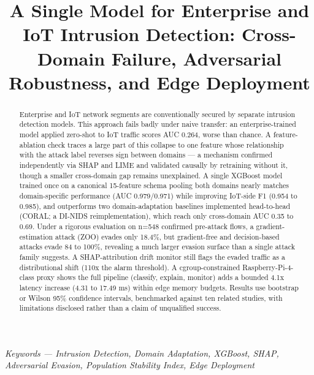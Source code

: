 \documentclass[conference]{IEEEtran}
\begin{document}
\title{A Single Model for Enterprise and IoT Intrusion Detection: Cross-Domain Failure, Adversarial Robustness, and Edge Deployment}

\author{
}

\maketitle

\begin{abstract}
Enterprise and IoT network segments are conventionally secured by separate intrusion detection models. This approach fails badly under naive transfer: an enterprise-trained model applied zero-shot to IoT traffic scores AUC 0.264, worse than chance. A feature-ablation check traces a large part of this collapse to one feature whose relationship with the attack label reverses sign between domains --- a mechanism confirmed independently via SHAP and LIME and validated causally by retraining without it, though a smaller cross-domain gap remains unexplained. A single XGBoost model trained once on a canonical 15-feature schema pooling both domains nearly matches domain-specific performance (AUC 0.979/0.971) while improving IoT-side F1 (0.954 to 0.985), and outperforms two domain-adaptation baselines implemented head-to-head (CORAL; a DI-NIDS reimplementation), which reach only cross-domain AUC 0.35 to 0.69. Under a rigorous evaluation on n=548 confirmed pre-attack flows, a gradient-estimation attack (ZOO) evades only 18.4\%, but gradient-free and decision-based attacks evade 84 to 100\%, revealing a much larger evasion surface than a single attack family suggests. A SHAP-attribution drift monitor still flags the evaded traffic as a distributional shift (110x the alarm threshold). A cgroup-constrained Raspberry-Pi-4-class proxy shows the full pipeline (classify, explain, monitor) adds a bounded 4.1x latency increase (4.31 to 17.49 ms) within edge memory budgets. Results use bootstrap or Wilson 95\% confidence intervals, benchmarked against ten related studies, with limitations disclosed rather than a claim of unqualified success.
\end{abstract}

{\itshape Keywords --- Intrusion Detection, Domain Adaptation, XGBoost, SHAP, Adversarial Evasion, Population Stability Index, Edge Deployment}
\end{document}
